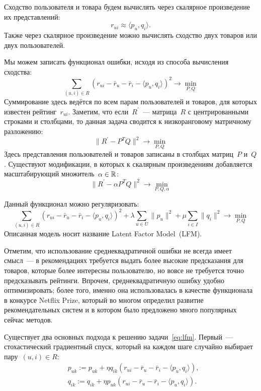 \documentclass[12pt,fleqn]{article}
\begin{document}
Сходство пользователя и товара будем вычислять через скалярное произведение их представлений:
\[
    r_{ui}
    \approx
    \langle p_u, q_i \rangle.
\]
Также через скалярное произведение можно вычислять сходство двух товаров или двух пользователей.

Мы можем записать функционал ошибки, исходя из способа вычисления сходства:
\begin{equation}
\label{eq:lfm}
    \sum_{(u, i) \in R}
        \left(
            r_{ui}
            - \bar r_u
            - \bar r_i
            - \langle p_u, q_i \rangle
        \right)^2
    \to
    \min_{P, Q}
\end{equation}
Суммирование здесь ведётся по всем парам пользователей и товаров, для которых известен рейтинг~$r_{ui}$.
Заметим, что если~$R^\prime$~--- матрица~$R$ с центрированными строками и столбцами,
то данная задача сводится к низкоранговому матричному разложению:
\[
    \|R^\prime - P^T Q\|^2 \to \min_{P, Q}
\]
Здесь представления пользователей и товаров записаны в столбцах матриц~$P$ и~$Q$.
Существуют модификации, в которых к скалярным произведениям добавляется масштабирующий множитель~$\alpha \in \mathbb{R}$:
\[
    \|R^\prime - \alpha P^T Q\|^2 \to \min_{P, Q, \alpha}
\]

Данный функционал можно регуляризовать:
\begin{equation}
\label{eq:lfmReg}
    \sum_{(u, i) \in R}
        \left(
            r_{ui}
            - \bar r_u
            - \bar r_i
            - \langle p_u, q_i \rangle
        \right)^2
    +
    \lambda
    \sum_{u \in U}
        \|p_u\|^2
    +
    \mu
    \sum_{i \in I}
        \|q_i\|^2
    \to
    \min_{P, Q}
\end{equation}
Описанная модель носит название Latent Factor Model~(LFM).

Отметим, что использование среднеквадратичной ошибки не всегда имеет смысл~---
в рекомендациях требуется выдать более высокие предсказания для товаров, которые более интересны пользователю,
но вовсе не требуется точно предсказывать рейтинги.
Впрочем, среднеквадратичную ошибку удобно оптимизировать;
более того, именно она использовалась в качестве функционала в конкурсе Netflix Prize,
который во многом определил развитие рекомендательных систем и в котором было предложено много
популярных сейчас методов.

Существует два основных подхода к решению задачи~\eqref{eq:lfm}.
Первый~--- стохастический градиентный спуск, который на каждом шаге случайно выбирает пару~$(u, i) \in R$:
\begin{align*}
    &p_{uk}
    :=
    p_{uk}
    +
    \eta
    q_{ik}
    \left(
        r_{ui}
        - \bar r_u
        - \bar r_i
        - \langle p_u, q_i \rangle
    \right),\\
    &q_{ik}
    :=
    q_{ik}
    +
    \eta
    p_{uk}
    \left(
        r_{ui}
        - \bar r_u
        - \bar r_i
        - \langle p_u, q_i \rangle
    \right).
\end{align*}
\end{document}
